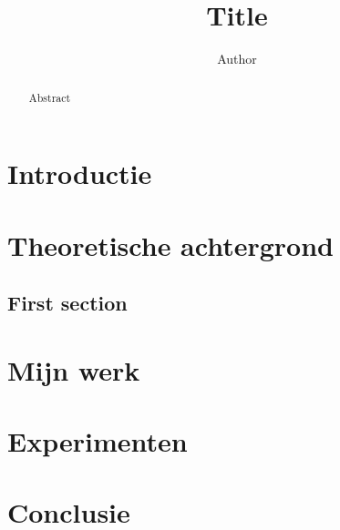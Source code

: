\documentclass[twoside]{Style/uva-inf-bachelor-thesis}
\title{Title}
\author{Author}
\begin{document}
\maketitle

\begin{abstract}
Abstract
\end{abstract}

\tableofcontents

\chapter{Introductie}



\chapter{Theoretische achtergrond}
\section{First section}

\chapter{Mijn werk}

\chapter{Experimenten}

\chapter{Conclusie}
\end{document}
